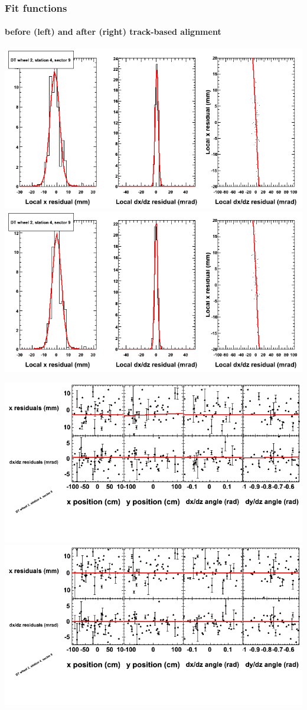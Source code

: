 \documentclass[compress]{beamer}
\begin{document}
\begin{frame}
\frametitle{Fit functions}
\framesubtitle{before (left) and after (right) track-based alignment}
\includegraphics[width=0.5\linewidth]{fitfunctions_re01/MBwhEst4sec09_bellcurves.png} \includegraphics[width=0.5\linewidth]{fitfunctions_re05/MBwhEst4sec09_bellcurves.png}

\includegraphics[width=0.5\linewidth]{fitfunctions_re01/MBwhEst4sec09_polynomials.png} \includegraphics[width=0.5\linewidth]{fitfunctions_re05/MBwhEst4sec09_polynomials.png}
\end{frame}
\end{document}
